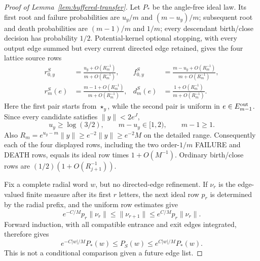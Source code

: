 \begin{proof}[Proof of Lemma~\ref{lem:buffered-transfer}]
Let $P_*$ be the angle-free ideal law.  Its first root and failure
probabilities are $u_y/m$ and $(m-u_y)/m$; subsequent root and death
probabilities are $(m-1)/m$ and $1/m$; every descendant
birth/close decision has probability $1/2$.  Potential-kernel optional
stopping, with every output edge summed but every current directed edge
retained, gives the four lattice source rows
\begin{equation}
\begin{aligned}
 r_{0,y}^S
   &=\frac{u_y+O(R_m^{-1})}{m+O(R_m^{-1})},
 & f_{0,y}^S
   &=\frac{m-u_y+O(R_m^{-1})}{m+O(R_m^{-1})},\\
 r_m^S(e)
   &=\frac{m-1+O(R_m^{-1})}{m+O(R_m^{-1})},
 & d_m^S(e)
   &=\frac{1+O(R_m^{-1})}{m+O(R_m^{-1})}.
\end{aligned}\label{eq:ct-transfer-45f-src}
\end{equation}
Here the first pair starts from $\star_y$, while the second pair is
uniform in $e\in E_{m-1}^{\rm out}$.  Since every candidate satisfies
$\|y\|<2e^J$,
\[
u_y\ge\log(3/2),\qquad m-u_y\in[1,2),\qquad m-1\ge1.
\]
Also $R_m=e^{u_y-m}\|y\|\ge e^{-2}\|y\|\ge e^{-2}M$ on the detailed
range.  Consequently each of the four displayed rows, including the two
order-$1/m$ FAILURE and DEATH rows, equals its ideal row times
$1+O(M^{-1})$.  Ordinary birth/close rows are
$(1/2)(1+O(R_{j+1}^{-1}))$.

Fix a complete radial word $w$, but no directed-edge refinement.  If
$\nu_r$ is the edge-valued finite measure after its first $r$ letters,
the next ideal row $p_r$ is determined by the radial prefix, and the
uniform row estimates give
\[
e^{-C/M}p_r\|\nu_r\|\le\|\nu_{r+1}\|
       \le e^{C/M}p_r\|\nu_r\|.
\]
Forward induction, with all compatible entrance and exit edges integrated,
therefore gives
\begin{equation}
e^{-C|w|/M}P_*(w)\le P_S(w)
       \le e^{C|w|/M}P_*(w).\label{eq:ct-transfer-45f}
\end{equation}
This is not a conditional comparison given a future edge list.


\end{proof}
